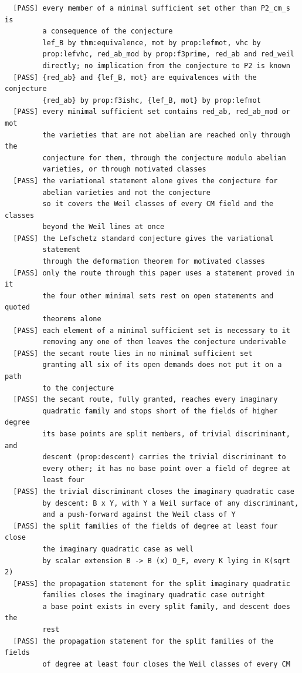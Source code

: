 \begin{small}
\begin{verbatim}
  [PASS] every member of a minimal sufficient set other than P2_cm_s is
         a consequence of the conjecture
         lef_B by thm:equivalence, mot by prop:lefmot, vhc by
         prop:lefvhc, red_ab_mod by prop:f3prime, red_ab and red_weil
         directly; no implication from the conjecture to P2 is known
  [PASS] {red_ab} and {lef_B, mot} are equivalences with the conjecture
         {red_ab} by prop:f3ishc, {lef_B, mot} by prop:lefmot
  [PASS] every minimal sufficient set contains red_ab, red_ab_mod or mot
         the varieties that are not abelian are reached only through the
         conjecture for them, through the conjecture modulo abelian
         varieties, or through motivated classes
  [PASS] the variational statement alone gives the conjecture for
         abelian varieties and not the conjecture
         so it covers the Weil classes of every CM field and the classes
         beyond the Weil lines at once
  [PASS] the Lefschetz standard conjecture gives the variational
         statement
         through the deformation theorem for motivated classes
  [PASS] only the route through this paper uses a statement proved in it
         the four other minimal sets rest on open statements and quoted
         theorems alone
  [PASS] each element of a minimal sufficient set is necessary to it
         removing any one of them leaves the conjecture underivable
  [PASS] the secant route lies in no minimal sufficient set
         granting all six of its open demands does not put it on a path
         to the conjecture
  [PASS] the secant route, fully granted, reaches every imaginary
         quadratic family and stops short of the fields of higher degree
         its base points are split members, of trivial discriminant, and
         descent (prop:descent) carries the trivial discriminant to
         every other; it has no base point over a field of degree at
         least four
  [PASS] the trivial discriminant closes the imaginary quadratic case
         by descent: B x Y, with Y a Weil surface of any discriminant,
         and a push-forward against the Weil class of Y
  [PASS] the split families of the fields of degree at least four close
         the imaginary quadratic case as well
         by scalar extension B -> B (x) O_F, every K lying in K(sqrt 2)
  [PASS] the propagation statement for the split imaginary quadratic
         families closes the imaginary quadratic case outright
         a base point exists in every split family, and descent does the
         rest
  [PASS] the propagation statement for the split families of the fields
         of degree at least four closes the Weil classes of every CM

\end{verbatim}
\end{small}
